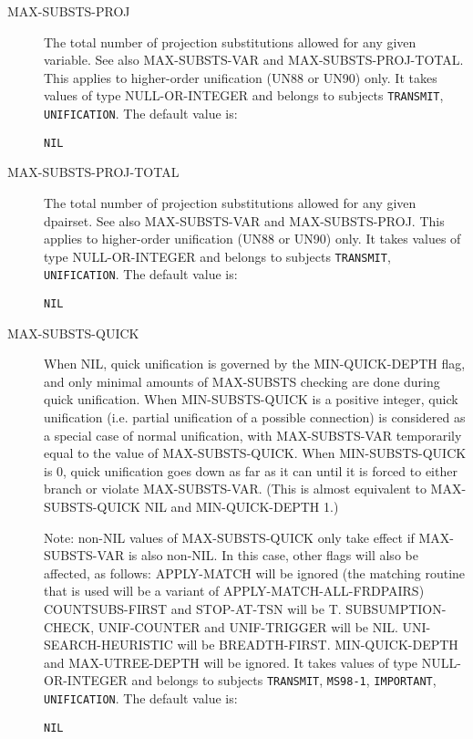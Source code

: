 \begin{description} 
\item[MAX-SUBSTS-PROJ]  
The total number of projection substitutions 
allowed for any given variable. See also MAX-SUBSTS-VAR
and MAX-SUBSTS-PROJ-TOTAL.
This applies to higher-order unification (UN88 or UN90) only.
It takes values of type NULL-OR-INTEGER and belongs to subjects \texttt{TRANSMIT}, \texttt{UNIFICATION}.  The default value is: \begin{lstlisting}
NIL
\end{lstlisting}

\item[MAX-SUBSTS-PROJ-TOTAL]  
The total number of projection substitutions 
allowed for any given dpairset. See also MAX-SUBSTS-VAR
and MAX-SUBSTS-PROJ.
This applies to higher-order unification (UN88 or UN90) only.
It takes values of type NULL-OR-INTEGER and belongs to subjects \texttt{TRANSMIT}, \texttt{UNIFICATION}.  The default value is: \begin{lstlisting}
NIL
\end{lstlisting}

\item[MAX-SUBSTS-QUICK]  
When NIL, quick unification is governed by the MIN-QUICK-DEPTH
flag, and only minimal amounts of MAX-SUBSTS checking are done during 
quick unification.
When MIN-SUBSTS-QUICK is a positive integer, quick unification 
(i.e. partial unification of a possible connection) is considered as a 
special case of normal unification, with MAX-SUBSTS-VAR temporarily 
equal to the value of MAX-SUBSTS-QUICK.
When MIN-SUBSTS-QUICK is 0, quick unification goes down as far as it can 
until it is forced to either branch or violate MAX-SUBSTS-VAR. (This is 
almost equivalent to MAX-SUBSTS-QUICK NIL and MIN-QUICK-DEPTH 1.) 

Note: non-NIL values of MAX-SUBSTS-QUICK only take effect if MAX-SUBSTS-VAR
is also non-NIL. In this case, other flags will also be affected, as follows:
APPLY-MATCH will be ignored (the matching routine that is used will be a 
variant of APPLY-MATCH-ALL-FRDPAIRS)
COUNTSUBS-FIRST and STOP-AT-TSN will be T.
SUBSUMPTION-CHECK, UNIF-COUNTER and UNIF-TRIGGER will be NIL.
UNI-SEARCH-HEURISTIC will be BREADTH-FIRST.
MIN-QUICK-DEPTH and MAX-UTREE-DEPTH will be ignored.
It takes values of type NULL-OR-INTEGER and belongs to subjects \texttt{TRANSMIT}, \texttt{MS98-1}, \texttt{IMPORTANT}, \texttt{UNIFICATION}.  The default value is: \begin{lstlisting}
NIL
\end{lstlisting}


\end{description}
